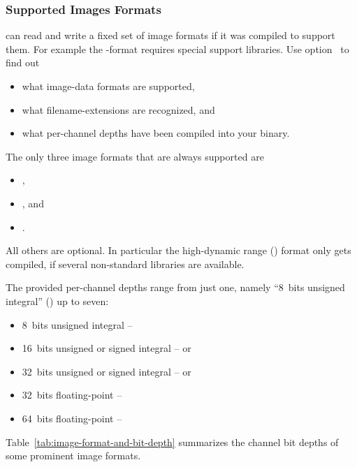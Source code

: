\subsubsection[Image Formats]{Supported Images Formats
  \label{sec:image-formats}
  }

\App{} can read and write a fixed set of image formats if it was
compiled to support them.  For example the -format
requires special support libraries.  Use
option~ to find out

\begin{itemize}
\item what image-data formats are supported,
\item what filename-extensions are recognized, and
\item what per-channel depths have been compiled into your \appcmd{}
  binary.
\end{itemize}

\noindent The only three image formats that are always supported are
\begin{itemize}
\item {},
\item {}, and
\item {}.
\end{itemize}

\noindent All others are optional.  In particular the high-dynamic
range () format  only gets compiled, if
several non-standard libraries are available.

The provided per-channel depths range from just one, namely ``8~bits
unsigned integral'' () up to seven:
  \begin{itemize}
  \item 8~bits unsigned integral -- 
  \item 16~bits unsigned or signed integral --  or 
  \item 32~bits unsigned or signed integral --  or 
  \item 32~bits floating-point -- 
  \item 64~bits floating-point -- 
  \end{itemize}

  Table~\ref{tab:image-format-and-bit-depth} summarizes the channel
  bit depths of some prominent image formats.

